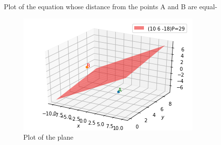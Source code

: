 \documentclass[journal,12pt,twocolumn]{IEEEtran}
\begin{document}
Plot of the equation whose distance from the points A and B are equal-
\begin{figure}[ht]
    \centering
    \includegraphics[width=\columnwidth]{Figure.png}
    \caption{Plot of the plane}
    \label{fig}
\end{figure}    
\end{document}
